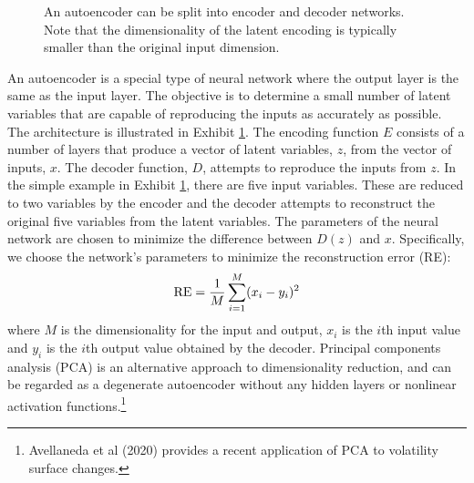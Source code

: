 \documentclass[12pt]{article}
\begin{document}
\begin{figure}[h!]
    \centering
    
    \vspace{2em}
  \caption{An autoencoder can be split into encoder and decoder networks. Note that the dimensionality of the latent encoding is typically smaller than the original input dimension.}
  \label{fig:autoencoder-net}
\end{figure}

An autoencoder is a special type of neural network where the output layer is the same as the input layer. The objective is to determine a small number of latent variables that are capable of reproducing the inputs as accurately as possible.  The architecture is illustrated in Exhibit \ref{fig:autoencoder-net}. The encoding function $E$ consists of a number of layers that produce a vector of latent variables, $z$,  from the vector of inputs, $x$. The decoder function, $D$, attempts to reproduce the inputs from $z$. In the simple example in Exhibit \ref{fig:autoencoder-net}, there are five input variables. These are reduced to two variables by the encoder and the decoder attempts to reconstruct the original five variables from the latent variables. The parameters of the neural network are chosen to minimize the difference between $D(z)$ and $x$. Specifically, we choose the network's parameters to minimize the reconstruction error (RE):
\begin{align}\label{eqn:recon}
{\rm RE}={1\over M}\sum_{i=1}^M(x_i-y_i)^2
\end{align}
where $M$ is the dimensionality for the input and output, $x_i$ is the $i$th input value and  $y_i$ is the $i$th output value obtained by the decoder.  Principal components analysis (PCA) is an alternative approach to dimensionality reduction, and can be regarded as  a degenerate autoencoder without any hidden layers or nonlinear activation functions.\footnote{Avellaneda et al (2020) provides a recent application of PCA to volatility surface changes.} 



\end{document}
